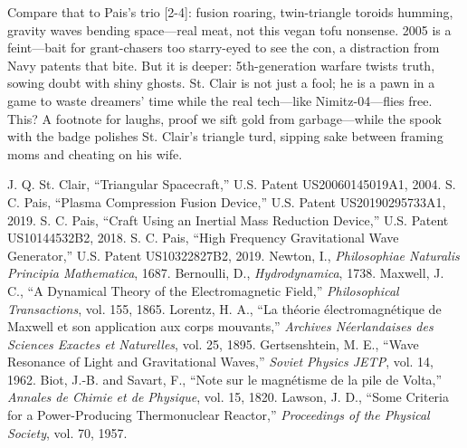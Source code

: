 \documentclass[11pt]{article}
\begin{document}
	Compare that to Pais’s trio [2-4]: fusion roaring, twin-triangle toroids humming, gravity waves bending space—real meat, not this vegan tofu nonsense. 2005 is a feint—bait for grant-chasers too starry-eyed to see the con, a distraction from Navy patents that bite. But it is deeper: 5th-generation warfare twists truth, sowing doubt with shiny ghosts. St. Clair is not just a fool; he is a pawn in a game to waste dreamers’ time while the real tech—like Nimitz-04—flies free. This? A footnote for laughs, proof we sift gold from garbage—while the spook with the badge polishes St. Clair’s triangle turd, sipping sake between framing moms and cheating on his wife.
	\newpage
	\begin{thebibliography}{11}
		 J. Q. St. Clair, ``Triangular Spacecraft,'' U.S. Patent US20060145019A1, 2004.
		 S. C. Pais, ``Plasma Compression Fusion Device,'' U.S. Patent US20190295733A1, 2019.
		 S. C. Pais, ``Craft Using an Inertial Mass Reduction Device,'' U.S. Patent US10144532B2, 2018.
		 S. C. Pais, ``High Frequency Gravitational Wave Generator,'' U.S. Patent US10322827B2, 2019.
		 Newton, I., \emph{Philosophiae Naturalis Principia Mathematica}, 1687.
		 Bernoulli, D., \emph{Hydrodynamica}, 1738.
		 Maxwell, J. C., ``A Dynamical Theory of the Electromagnetic Field,'' \emph{Philosophical Transactions}, vol. 155, 1865.
		 Lorentz, H. A., ``La théorie électromagnétique de Maxwell et son application aux corps mouvants,'' \emph{Archives Néerlandaises des Sciences Exactes et Naturelles}, vol. 25, 1895.
		 Gertsenshtein, M. E., ``Wave Resonance of Light and Gravitational Waves,'' \emph{Soviet Physics JETP}, vol. 14, 1962.
		 Biot, J.-B. and Savart, F., ``Note sur le magnétisme de la pile de Volta,'' \emph{Annales de Chimie et de Physique}, vol. 15, 1820.
		 Lawson, J. D., ``Some Criteria for a Power-Producing Thermonuclear Reactor,'' \emph{Proceedings of the Physical Society}, vol. 70, 1957.
	\end{thebibliography}
	
\end{document}
